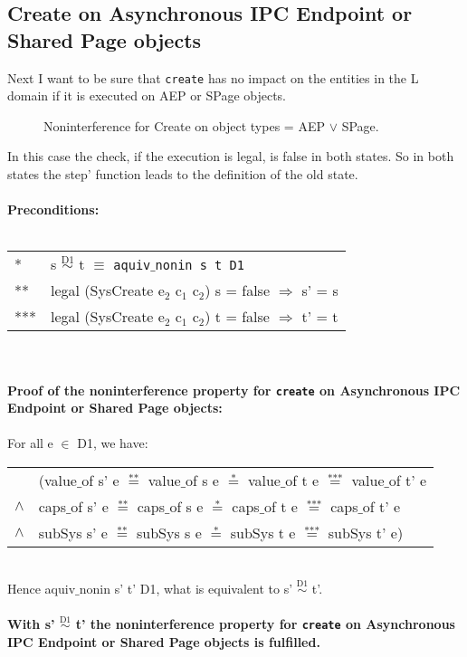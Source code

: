 \subsection{Create on Asynchronous IPC Endpoint or Shared Page objects}
Next I want to be sure that \texttt{create} has no impact on the entities in the L domain if it is executed on AEP or SPage objects.\\
\begin{figure}[H]
\caption{Noninterference for Create on object types = AEP $\vee$ SPage.}
\end{figure}
In this case the check, if the execution is legal, is false in both states. So in both states the step' function leads to the definition of the old state. \\ \\
\textbf{Preconditions:} \\ \\
\begin{tabular}{ll}
* & s $\overset{\text{D1}}{\sim}$ t $\equiv$ \texttt{aquiv$\_$nonin s t D1}	\\ 
** & legal (SysCreate e$_2$ c$_1$ c$_2$) s = false $\Rightarrow$ s' = s \\ 
*** & legal (SysCreate e$_2$ c$_1$ c$_2$) t = false $\Rightarrow$ t' = t
\end{tabular}\\ \\ 
\textbf{Proof of the noninterference property for \texttt{create} on Asynchronous IPC Endpoint or Shared Page objects:}\\ \\
For all e $\in$ D1, we have: \\ 
\begin{tabular}{ll}
& (value$\_$of s' e $\overset{\text{**}}{=}$ value$\_$of s e $\overset{\text{*}}{=}$ value$\_$of t e $\overset{\text{***}}{=}$ value$\_$of t' e \\
$\wedge$ & caps$\_$of s' e $\overset{\text{**}}{=}$ caps$\_$of s e $\overset{\text{*}}{=}$ caps$\_$of t e $\overset{\text{***}}{=}$ caps$\_$of t' e \\
$\wedge$ & subSys s' e $\overset{\text{**}}{=}$ subSys s e $\overset{\text{*}}{=}$ subSys t e $\overset{\text{***}}{=}$ subSys t' e)
\end{tabular} \\
Hence aquiv$\_$nonin s' t' D1, what is equivalent to s' $\overset{\text{D1}}{\sim}$ t'. \\ \\ 
\textbf{With s' $\overset{\text{D1}}{\sim}$ t' the noninterference property for \texttt{create} on Asynchronous IPC Endpoint or Shared Page objects is fulfilled.} 
